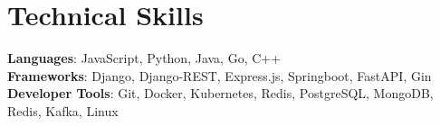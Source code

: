 \documentclass[letterpaper,11pt]{article}
\begin{document}
%
\section{Technical Skills}
 \begin{itemize}[leftmargin=0.15in, label={}]
    \small{\item{
     \textbf{Languages}{: JavaScript, Python, Java, Go, C++} \\
     \textbf{Frameworks}{: Django, Django-REST, Express.js, Springboot, FastAPI, Gin} \\
     \textbf{Developer Tools}{: Git, Docker, Kubernetes, Redis, PostgreSQL, MongoDB, Redis, Kafka, Linux} \\
    }}
 \end{itemize}


\end{document}
